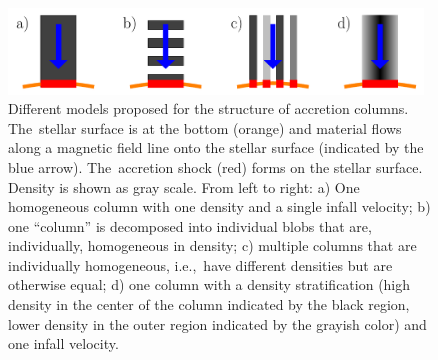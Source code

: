 \documentclass[graybox, nosecnum]{svmult}
\begin{document}
\begin{figure}[t]
    \centering
    \includegraphics[width=11cm]{sketches/column_sketch.pdf}
    \caption{Different models proposed for the 
    structure of accretion columns. The~stellar surface is at the bottom (orange) and 
    material flows along a magnetic field line onto the stellar surface (indicated 
    by the blue arrow). The~accretion shock (red) forms on the stellar surface. 
    Density is shown as gray scale. From left to right: 
    a) One homogeneous column with one density and a single infall velocity; 
    b) one ``column'' is decomposed into individual blobs that are, individually, homogeneous in density;
    c) multiple columns that are individually homogeneous, i.e.,~have different densities but are otherwise equal; 
    d) one column with a density stratification (high density in the center of the column indicated by the black region, lower density in the outer region indicated by the grayish color) and one infall velocity. 
    }
    \label{fig:column}
\end{figure}
\end{document}
